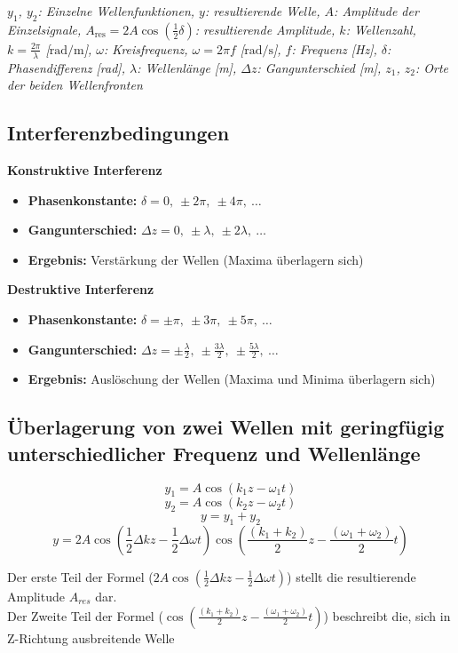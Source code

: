 \documentclass[a4paper,10pt]{article}
\newenvironment{displayformula}
{
	\begin{framed}
		\color{formulaColor}
	}
	{\end{framed}}
\newcommand{\formulalegend}[1]{%
	\par\vspace{0.5ex}%
	{{\color{legendColor}\RaggedRight\small\textit{#1}}}%
	\par\vspace{1.5ex}%
}
\begin{document}
\formulalegend{
	$y_1$, $y_2$: Einzelne Wellenfunktionen, 
	$y$: resultierende Welle, 
	$A$: Amplitude der Einzelsignale, 
	$A_{\text{res}} = 2A \cos(\frac{1}{2}\delta)$: resultierende Amplitude, 
	$k$: Wellenzahl, $k = \frac{2\pi}{\lambda}$ [$\text{rad}/\text{m}$], 
	$\omega$: Kreisfrequenz, $\omega = 2\pi f$ [$\text{rad}/\text{s}$], 
	$f$: Frequenz [Hz], 
	$\delta$: Phasendifferenz [rad], 
	$\lambda$: Wellenlänge [m], 
	$\Delta z$: Gangunterschied [m], 
	$z_1$, $z_2$: Orte der beiden Wellenfronten
}



\subsection{Interferenzbedingungen}

\textbf{Konstruktive Interferenz}

\begin{itemize}
	\item \textbf{Phasenkonstante:} $\delta = 0,\ \pm 2\pi,\ \pm 4\pi,\ \dots$
	\item \textbf{Gangunterschied:} $\Delta z = 0,\ \pm \lambda,\ \pm 2\lambda,\ \dots$
	\item \textbf{Ergebnis:} Verstärkung der Wellen (Maxima überlagern sich)
\end{itemize}

\vspace{1ex}

\textbf{Destruktive Interferenz}

\begin{itemize}
	\item \textbf{Phasenkonstante:} $\delta = \pm \pi,\ \pm 3\pi,\ \pm 5\pi,\ \dots$
	\item \textbf{Gangunterschied:} $\Delta z = \pm \frac{\lambda}{2},\ \pm \frac{3\lambda}{2},\ \pm \frac{5\lambda}{2},\ \dots$
	\item \textbf{Ergebnis:} Auslöschung der Wellen (Maxima und Minima überlagern sich)
\end{itemize}

\subsection{Überlagerung von zwei Wellen mit geringfügig unterschiedlicher Frequenz und Wellenlänge}

\begin{displayformula}
	\[
	y_1 = A \cos (k_1z - \omega_1 t)
	\]
	\[
	y_2 = A \cos (k_2z - \omega_2 t)
	\]
	\[
	y = y_1 + y_2
	\]
	\[
	y = 2 A \cos (\frac{1}{2} \Delta kz - \frac{1}{2} \Delta \omega t) \cos (\frac{(k_1 + k_2)}{2} z - \frac{(\omega_1 + \omega_2)}{2}t)
	\]
\end{displayformula}
Der erste Teil der Formel ($2 A \cos (\frac{1}{2} \Delta kz - \frac{1}{2} \Delta \omega t)$) stellt die resultierende Amplitude $A_{res}$ dar. \\
Der Zweite Teil der Formel ($\cos (\frac{(k_1 + k_2)}{2} z - \frac{(\omega_1 + \omega_2)}{2}t)$) beschreibt die, sich in Z-Richtung ausbreitende Welle
\end{document}
